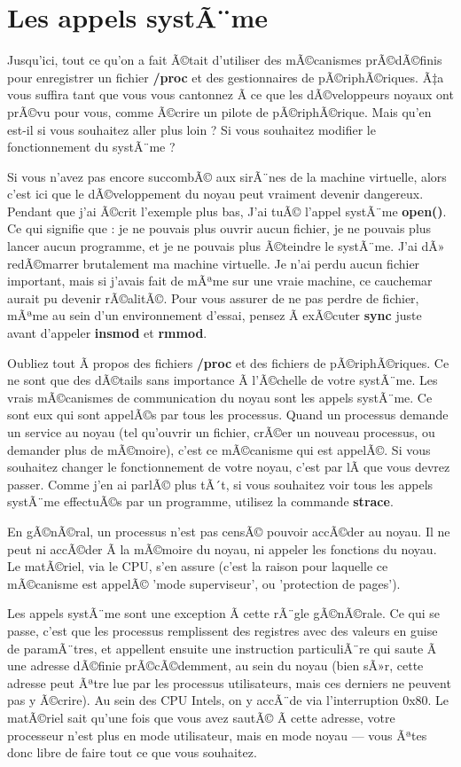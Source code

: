 \documentclass[11pt]{article}
\begin{document}
\section*{Les appels systÃ¨me}
\label{sec-10}

Jusqu'ici, tout ce qu'on a fait Ã©tait d'utiliser des mÃ©canismes prÃ©dÃ©finis pour enregistrer un fichier \textbf{/proc} et des gestionnaires de pÃ©riphÃ©riques. Ã‡a vous suffira tant que vous vous cantonnez Ã  ce que les dÃ©veloppeurs noyaux ont prÃ©vu pour vous, comme Ã©crire un pilote de pÃ©riphÃ©rique. Mais qu'en est-il si vous souhaitez aller plus loin ? Si vous souhaitez modifier le fonctionnement du systÃ¨me ?

Si vous n'avez pas encore succombÃ© aux sirÃ¨nes de la machine virtuelle, alors c'est ici que le dÃ©veloppement du noyau peut vraiment devenir dangereux. Pendant que j'ai Ã©crit l'exemple plus bas, J'ai tuÃ© l'appel systÃ¨me \textbf{open()}. Ce qui signifie que : je ne pouvais plus ouvrir aucun fichier, je ne pouvais plus lancer aucun programme, et je ne pouvais plus Ã©teindre le systÃ¨me. J'ai dÃ» redÃ©marrer brutalement ma machine virtuelle. Je n'ai perdu aucun fichier important, mais si j'avais fait de mÃªme sur une vraie machine, ce cauchemar aurait pu devenir rÃ©alitÃ©. Pour vous assurer de ne pas perdre de fichier, mÃªme au sein d'un environnement d'essai, pensez Ã  exÃ©cuter \textbf{sync} juste avant d'appeler \textbf{insmod} et \textbf{rmmod}.

Oubliez tout Ã  propos des fichiers \textbf{/proc} et des fichiers de pÃ©riphÃ©riques. Ce ne sont que des dÃ©tails sans importance Ã  l'Ã©chelle de votre systÃ¨me. Les vrais mÃ©canismes de communication du noyau sont les appels systÃ¨me. Ce sont eux qui sont appelÃ©s par tous les processus. Quand un processus demande un service au noyau (tel qu'ouvrir un fichier, crÃ©er un nouveau processus, ou demander plus de mÃ©moire), c'est ce mÃ©canisme qui est appelÃ©. Si vous souhaitez changer le fonctionnement de votre noyau, c'est par lÃ  que vous devrez passer. Comme j'en ai parlÃ© plus tÃ´t, si vous souhaitez voir tous les appels systÃ¨me effectuÃ©s par un programme, utilisez la commande \textbf{strace}.

En gÃ©nÃ©ral, un processus n'est pas censÃ© pouvoir accÃ©der au noyau. Il ne peut ni accÃ©der Ã  la mÃ©moire du noyau, ni appeler les fonctions du noyau. Le matÃ©riel, via le CPU, s'en assure (c'est la raison pour laquelle ce mÃ©canisme est appelÃ© 'mode superviseur', ou 'protection de pages').

Les appels systÃ¨me sont une exception Ã  cette rÃ¨gle gÃ©nÃ©rale. Ce qui se passe, c'est que les processus remplissent des registres avec des valeurs en guise de paramÃ¨tres, et appellent ensuite une instruction particuliÃ¨re qui saute Ã  une adresse dÃ©finie prÃ©cÃ©demment, au sein du noyau (bien sÃ»r, cette adresse peut Ãªtre lue par les processus utilisateurs, mais ces derniers ne peuvent pas y Ã©crire). Au sein des CPU Intels, on y accÃ¨de via l'interruption 0x80. Le matÃ©riel sait qu'une fois que vous avez sautÃ© Ã  cette adresse, votre processeur n'est plus en mode utilisateur, mais en mode noyau --- vous Ãªtes donc libre de faire tout ce que vous souhaitez.
\end{document}
